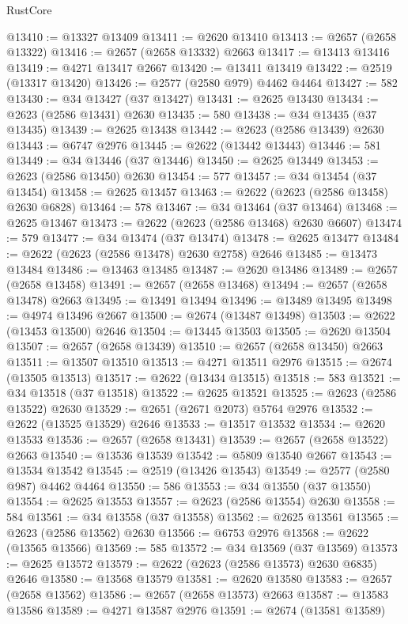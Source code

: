 \begin{lexlean}{RustCore}
\begin{coremodule}
@13410 := @13327 @13409
@13411 := @2620 @13410
@13413 := @2657 (@2658 @13322)
@13416 := @2657 (@2658 @13332) @2663
@13417 := @13413 @13416
@13419 := @4271 @13417 @2667
@13420 := @13411 @13419
@13422 := @2519 (@13317 @13420)
@13426 := @2577 (@2580 @979) @4462 @4464
@13427 := 582
@13430 := @34 @13427 (@37 @13427)
@13431 := @2625 @13430
@13434 := @2623 (@2586 @13431) @2630
@13435 := 580
@13438 := @34 @13435 (@37 @13435)
@13439 := @2625 @13438
@13442 := @2623 (@2586 @13439) @2630
@13443 := @6747 @2976
@13445 := @2622 (@13442 @13443)
@13446 := 581
@13449 := @34 @13446 (@37 @13446)
@13450 := @2625 @13449
@13453 := @2623 (@2586 @13450) @2630
@13454 := 577
@13457 := @34 @13454 (@37 @13454)
@13458 := @2625 @13457
@13463 := @2622 (@2623 (@2586 @13458) @2630 @6828)
@13464 := 578
@13467 := @34 @13464 (@37 @13464)
@13468 := @2625 @13467
@13473 := @2622 (@2623 (@2586 @13468) @2630 @6607)
@13474 := 579
@13477 := @34 @13474 (@37 @13474)
@13478 := @2625 @13477
@13484 := @2622 (@2623 (@2586 @13478) @2630 @2758) @2646
@13485 := @13473 @13484
@13486 := @13463 @13485
@13487 := @2620 @13486
@13489 := @2657 (@2658 @13458)
@13491 := @2657 (@2658 @13468)
@13494 := @2657 (@2658 @13478) @2663
@13495 := @13491 @13494
@13496 := @13489 @13495
@13498 := @4974 @13496 @2667
@13500 := @2674 (@13487 @13498)
@13503 := @2622 (@13453 @13500) @2646
@13504 := @13445 @13503
@13505 := @2620 @13504
@13507 := @2657 (@2658 @13439)
@13510 := @2657 (@2658 @13450) @2663
@13511 := @13507 @13510
@13513 := @4271 @13511 @2976
@13515 := @2674 (@13505 @13513)
@13517 := @2622 (@13434 @13515)
@13518 := 583
@13521 := @34 @13518 (@37 @13518)
@13522 := @2625 @13521
@13525 := @2623 (@2586 @13522) @2630
@13529 := @2651 (@2671 @2073) @5764 @2976
@13532 := @2622 (@13525 @13529) @2646
@13533 := @13517 @13532
@13534 := @2620 @13533
@13536 := @2657 (@2658 @13431)
@13539 := @2657 (@2658 @13522) @2663
@13540 := @13536 @13539
@13542 := @5809 @13540 @2667
@13543 := @13534 @13542
@13545 := @2519 (@13426 @13543)
@13549 := @2577 (@2580 @987) @4462 @4464
@13550 := 586
@13553 := @34 @13550 (@37 @13550)
@13554 := @2625 @13553
@13557 := @2623 (@2586 @13554) @2630
@13558 := 584
@13561 := @34 @13558 (@37 @13558)
@13562 := @2625 @13561
@13565 := @2623 (@2586 @13562) @2630
@13566 := @6753 @2976
@13568 := @2622 (@13565 @13566)
@13569 := 585
@13572 := @34 @13569 (@37 @13569)
@13573 := @2625 @13572
@13579 := @2622 (@2623 (@2586 @13573) @2630 @6835) @2646
@13580 := @13568 @13579
@13581 := @2620 @13580
@13583 := @2657 (@2658 @13562)
@13586 := @2657 (@2658 @13573) @2663
@13587 := @13583 @13586
@13589 := @4271 @13587 @2976
@13591 := @2674 (@13581 @13589)

\end{coremodule}
\end{lexlean}
